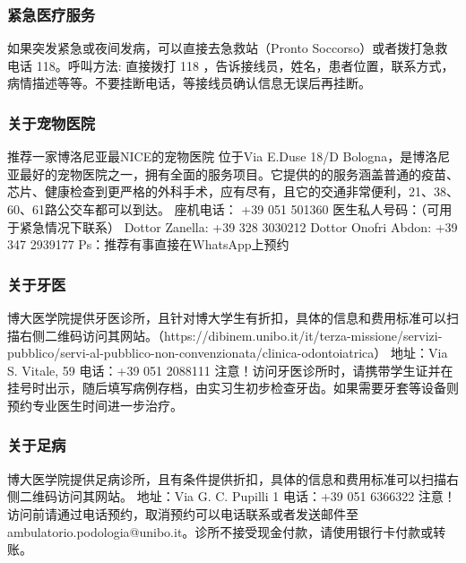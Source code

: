 \subsubsection{紧急医疗服务}

如果突发紧急或夜间发病，可以直接去急救站（Pronto Soccorso）或者拨打急救电话 118。呼叫方法: 直接拨打 118 ，告诉接线员，姓名，患者位置，联系方式，病情描述等等。不要挂断电话，等接线员确认信息无误后再挂断。
\subsubsection{关于宠物医院}
推荐一家博洛尼亚最NICE的宠物医院
位于Via E.Duse 18/D Bologna，是博洛尼亚最好的宠物医院之一，拥有全面的服务项目。它提供的的服务涵盖普通的疫苗、芯片、健康检查到更严格的外科手术，应有尽有，且它的交通非常便利，21、38、60、61路公交车都可以到达。
座机电话：
+39 051 501360
医生私人号码：（可用于紧急情况下联系）
Dottor Zanella:
+39 328 3030212
Dottor Onofri Abdon:
+39 347 2939177
Ps：推荐有事直接在WhatsApp上预约

\subsubsection{关于牙医}
博大医学院提供牙医诊所，且针对博大学生有折扣，具体的信息和费用标准可以扫描右侧二维码访问其网站。（https://dibinem.unibo.it/it/terza-missione/servizi-pubblico/servi-al-pubblico-non-convenzionata/clinica-odontoiatrica）
地址：Via S. Vitale, 59
电话：+39 051 2088111
注意！访问牙医诊所时，请携带学生证并在挂号时出示，随后填写病例存档，由实习生初步检查牙齿。如果需要牙套等设备则预约专业医生时间进一步治疗。

\subsubsection{关于足病}
博大医学院提供足病诊所，且有条件提供折扣，具体的信息和费用标准可以扫描右侧二维码访问其网站。
地址：Via G. C. Pupilli 1
电话：+39 051 6366322
注意！访问前请通过电话预约，取消预约可以电话联系或者发送邮件至ambulatorio.podologia@unibo.it。诊所不接受现金付款，请使用银行卡付款或转账。

